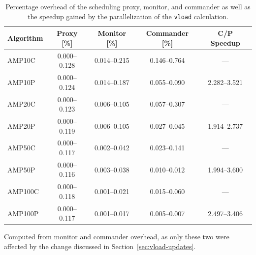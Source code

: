 \begin{table}
	\centering
	\begin{threeparttable}
		\begin{tabular}{l c c c c}
			\toprule
			Algorithm & Proxy [\%] & Monitor [\%] & Commander [\%] & C/P Speedup\tnote{1} \\
			\midrule
			AMP10C  & 0.000--0.128 & 0.014--0.215 & 0.146--0.764 & --- \\
			AMP10P  & 0.000--0.124 & 0.014--0.187 & 0.055--0.090 & 2.282--3.521 \\
			\addlinespace
			AMP20C  & 0.000--0.123 & 0.006--0.105 & 0.057--0.307 & --- \\
			AMP20P  & 0.000--0.119 & 0.006--0.105 & 0.027--0.045 & 1.914--2.737 \\
			\addlinespace
			AMP50C  & 0.000--0.117 & 0.002--0.042 & 0.023--0.141 & --- \\
			AMP50P  & 0.000--0.116 & 0.003--0.038 & 0.010--0.012 & 1.994--3.600 \\
			\addlinespace
			AMP100C & 0.000--0.118 & 0.001--0.021 & 0.015--0.060 & --- \\
			AMP100P & 0.000--0.117 & 0.001--0.017 & 0.005--0.007 & 2.497--3.406 \\
			\bottomrule
		\end{tabular}
		\begin{tablenotes}
			\item[1] Computed from monitor and commander overhead, as only these two were affected by the change discussed in Section~\ref{sec:vload-updates}.
		\end{tablenotes}
	\end{threeparttable}
	\caption{Percentage overhead of the scheduling proxy, monitor, and commander as well as the speedup gained by the parallelization of the \texttt{vload} calculation.}
	\label{tab:overhead-normalized}
\end{table}


